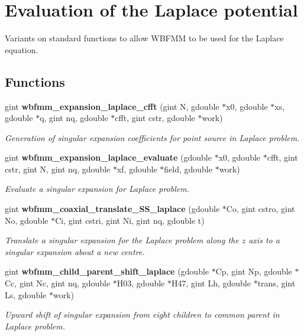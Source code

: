 \section{Evaluation of the Laplace potential}
\label{group__laplace}


Variants on standard functions to allow W\+B\+F\+M\+M to be used for the Laplace equation.  


\subsection*{Functions}
\begin{DoxyCompactItemize}
\item 
gint {\bf wbfmm\+\_\+expansion\+\_\+laplace\+\_\+cfft} (gint N, gdouble $\ast$x0, gdouble $\ast$xs, gdouble $\ast$q, gint nq, gdouble $\ast$cfft, gint cstr, gdouble $\ast$work)
\begin{DoxyCompactList}\small\item\em Generation of singular expansion coefficients for point source in Laplace problem. \end{DoxyCompactList}\item 
gint {\bf wbfmm\+\_\+expansion\+\_\+laplace\+\_\+evaluate} (gdouble $\ast$x0, gdouble $\ast$cfft, gint cstr, gint N, gint nq, gdouble $\ast$xf, gdouble $\ast$field, gdouble $\ast$work)
\begin{DoxyCompactList}\small\item\em Evaluate a singular expansion for Laplace problem. \end{DoxyCompactList}\item 
gint {\bf wbfmm\+\_\+coaxial\+\_\+translate\+\_\+\+S\+S\+\_\+laplace} (gdouble $\ast$Co, gint cstro, gint No, gdouble $\ast$Ci, gint cstri, gint Ni, gint nq, gdouble t)
\begin{DoxyCompactList}\small\item\em Translate a singular expansion for the Laplace problem along the $z$ axis to a singular expansion about a new centre. \end{DoxyCompactList}\item 
gint {\bf wbfmm\+\_\+child\+\_\+parent\+\_\+shift\+\_\+laplace} (gdouble $\ast$Cp, gint Np, gdouble $\ast$Cc, gint Nc, gint nq, gdouble $\ast$H03, gdouble $\ast$H47, gint Lh, gdouble $\ast$trans, gint Ls, gdouble $\ast$work)
\begin{DoxyCompactList}\small\item\em Upward shift of singular expansion from eight children to common parent in Laplace problem. \end{DoxyCompactList}\item 

\end{DoxyCompactItemize}
